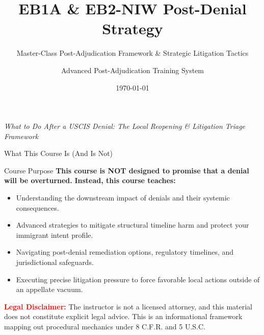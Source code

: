 \documentclass[11pt]{beamer}
\title{EB1A \& EB2-NIW Post-Denial Strategy}
\subtitle{Master-Class Post-Adjudication Framework \& Strategic Litigation Tactics}
\author{Advanced Post-Adjudication Training System}
\date{\today}
\begin{document}
	
	\begin{frame}
		\titlepage
		\centering
		\scriptsize \textit{What to Do After a USCIS Denial: The Local Reopening \& Litigation Triage Framework}
	\end{frame}
	
	\begin{frame}{What This Course Is (And Is Not)}
		\scriptsize
		\begin{block}{Course Purpose}
			\textbf{This course is NOT designed to promise that a denial will be overturned.}
			\vspace{0.1cm}
			\textbf{Instead, this course teaches:}
			\begin{itemize}
				\item Understanding the downstream impact of denials and their systemic consequences.
				\item Advanced strategies to mitigate structural timeline harm and protect your immigrant intent profile.
				\item Navigating post-denial remediation options, regulatory timelines, and jurisdictional safeguards.
				\item Executing precise litigation pressure to force favorable local actions outside of an appellate vacuum.
			\end{itemize}
			\textcolor{red}{\textbf{Legal Disclaimer:}} The instructor is not a licensed attorney, and this material does not constitute explicit legal advice. This is an informational framework mapping out procedural mechanics under 8 C.F.R. and 5 U.S.C.
		\end{block}
	\end{frame}
	
\end{document}
